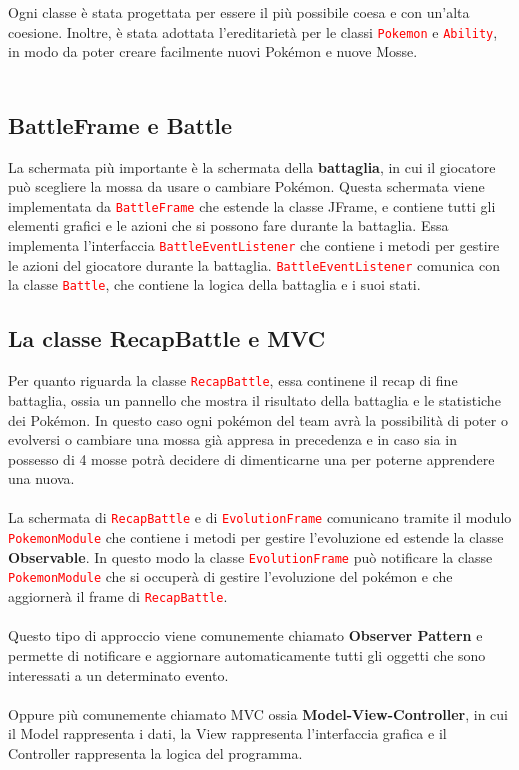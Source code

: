 \documentclass[12pt]{article}
\begin{document}
\par\medskip\noindent
Ogni classe è stata progettata per essere il più possibile coesa e con un'alta coesione. Inoltre, è stata adottata l'ereditarietà per le classi \texttt{\textcolor{red}{Pokemon}} e \texttt{\textcolor{red}{Ability}}, in modo da poter creare facilmente nuovi Pokémon e nuove Mosse. 
\\ \\
\subsection{BattleFrame e Battle}
La schermata più importante è la schermata della \textbf{battaglia}, in cui il giocatore può scegliere la mossa da usare o cambiare Pokémon. Questa schermata viene implementata da \texttt{\textcolor{red}{BattleFrame}} che estende la classe JFrame, e contiene tutti gli elementi grafici e le azioni che si possono fare durante la battaglia.
Essa implementa l'interfaccia \texttt{\textcolor{red}{BattleEventListener}} che contiene i metodi per gestire le azioni del giocatore durante la battaglia. \texttt{\textcolor{red}{BattleEventListener}} comunica con la classe \texttt{\textcolor{red}{Battle}}, che contiene la logica della battaglia e i suoi stati.
\subsection{La classe RecapBattle e MVC}
Per quanto riguarda la classe \texttt{\textcolor{red}{RecapBattle}}, essa continene il recap di fine battaglia, ossia un pannello che mostra il risultato della battaglia e le statistiche dei Pokémon.
In questo caso ogni pokémon del team avrà la possibilità di poter o evolversi o cambiare una mossa già appresa in precedenza e in caso sia in possesso di 4 mosse potrà decidere di dimenticarne una per poterne apprendere una nuova.
\\ \\
La schermata di \texttt{\textcolor{red}{RecapBattle}} e di \texttt{\textcolor{red}{EvolutionFrame}} comunicano tramite il modulo \texttt{\textcolor{red}{PokemonModule}} che contiene i metodi per gestire l'evoluzione ed estende la classe \textbf{Observable}.
In questo modo la classe \texttt{\textcolor{red}{EvolutionFrame}} può notificare la classe \texttt{\textcolor{red}{PokemonModule}} che si occuperà di gestire l'evoluzione del pokémon e che aggiornerà il frame di \texttt{\textcolor{red}{RecapBattle}}.
\\ \\
Questo tipo di approccio viene comunemente chiamato \textbf{Observer Pattern} e permette di notificare e aggiornare automaticamente tutti gli oggetti che sono interessati a un determinato evento.
\\ \\ 
Oppure più comunemente chiamato MVC ossia \textbf{Model-View-Controller}, in cui il Model rappresenta i dati, la View rappresenta l'interfaccia grafica e il Controller rappresenta la logica del programma.
\end{document}
